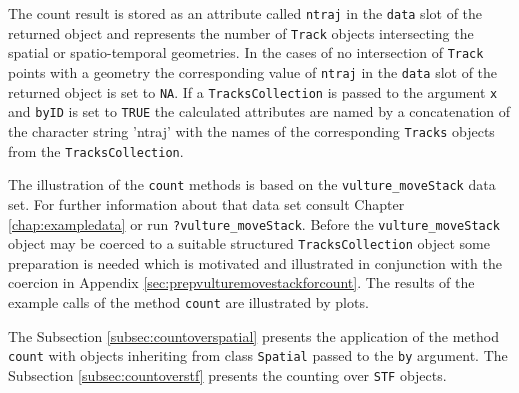 \documentclass[12pt, oneside, a4paper]{scrbook}
\let\code=\texttt
\begin{document}
\par\medskip

The count result is stored as an attribute called \code{ntraj} in the \code{data} slot of the returned object and represents the number of \code{Track} objects intersecting the spatial or spatio-temporal geometries. In the cases of no intersection of \code{Track} points with a geometry the corresponding value of \code{ntraj} in the \code{data} slot of the returned object is set to \code{NA}. If a \code{TracksCollection} is passed to the argument \code{x} and \code{byID} is set to \code{TRUE} the calculated attributes are named by a concatenation of the character string 'ntraj' with the names of the corresponding \code{Tracks} objects from the \code{TracksCollection}.
\par\medskip

The illustration of the \code{count} methods is based on the \code{vulture\_moveStack} data set. For further information about that data set consult Chapter \ref{chap:exampledata} or run \code{?vulture\_moveStack}. Before the \code{vulture\_moveStack} object may be coerced to a suitable structured \code{TracksCollection} object some preparation is needed which is motivated and illustrated in conjunction with the coercion in Appendix \ref{sec:prepvulturemovestackforcount}.
The results of the example calls of the method \code{count} are illustrated by plots. 

\par\medskip

The Subsection \ref{subsec:countoverspatial} presents the application of the  method \code{count} with objects inheriting from class \code{Spatial} passed to the \code{by} argument.
The Subsection \ref{subsec:countoverstf} presents the counting over \code{STF} objects.
\par\medskip



\end{document}
